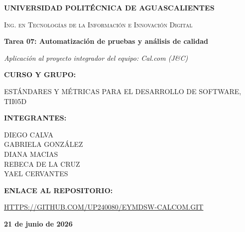 \documentclass[12pt,a4paper]{article}
\begin{document}
\begin{titlepage}
    \centering
    \vspace*{1cm}
    
    {\bfseries\LARGE UNIVERSIDAD POLITÉCNICA DE AGUASCALIENTES \par}
    \vspace{0.5cm}
    {\scshape\Large Ing. en Tecnologías de la Información e Innovación Digital \par}
    
    \vspace{2.5cm}
    
    {\bfseries\huge Tarea 07: Automatización de pruebas y análisis de calidad \par}
    \vspace{0.5cm}
    {\itshape\Large Aplicación al proyecto integrador del equipo: Cal.com (J\&C) \par}
    
    \vspace{2.5cm}
    
    {\Large\bfseries CURSO Y GRUPO:\par}
    {\large ESTÁNDARES Y MÉTRICAS PARA EL DESARROLLO DE SOFTWARE, TII05D \par}
    
    \vspace{2cm}
    
    {\Large\bfseries INTEGRANTES:\par}
    \vspace{0.5cm}
    {\large 
    DIEGO CALVA \\
    GABRIELA GONZÁLEZ \\
    DIANA MACIAS \\
    REBECA DE LA CRUZ \\
    YAEL CERVANTES 
    \par}
    
    \vspace{2cm}
    
    {\Large\bfseries ENLACE AL REPOSITORIO:\par}
    {\large \url{HTTPS://GITHUB.COM/UP240080/EYMDSW-CALCOM.GIT} \par}
    
    \vfill
    
    {\large \textbf{21 de junio de 2026} \par}
\end{titlepage}

\newpage
\end{document}
